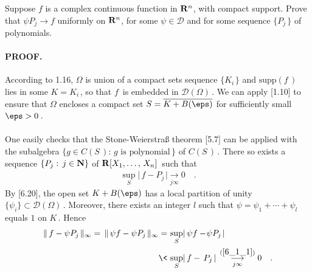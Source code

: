 {\CMUCS Suppose $f$ is a complex continuous function in ${\mathbf R}^n$, with compact support. \!\!Prove that $\psi P_j\to \!f$ uniformly on ${\mathbf R}^n$, for some $\psi\in \mathscr{D}$ and for some sequence $\{P_j\,\}$ of polynomials.}
\paragraph{PROOF.} According to 1.16, $\Omega$ is union of a compact sets sequence $\{K_{i\,}\}$ and $\text{supp} (f\,)$ lies in some $K= K_{i\,}$, so that $f\,$ is embedded in $\mathscr{D}(\Omega)\,$. We can apply [1.10] to ensure that $\Omega$ encloses a compact set $S=\overline{K +B(\eps)}$ for sufficiently small $\eps>0\,$.\\
\\
One easily checks that the Stone-Weierstraß theorem [5.7] can be applied with the subalgebra $ \{ g\in C(S\,) :\, g \text{ is polynomial}\,\}$ of $C(S\,)\,$.
There so exists a sequence $\{P_j:\, j\in {\mathbf N}\}$ of ${\mathbf R}[X_1,\dotsc,\, X_n]\,$ such that 
\begin{align}\label{6_1_1}
\sup_S \lvert\, f-P_{j\,} \rvert  \underset{j\infty}{\longrightarrow} 0\quad.
\end{align} 
 By [6.20], the open set $K +B(\eps)$ has a local partition of unity $\{\psi_i\}\subset \mathscr{D}(\Omega)\,$. Moreover, there exists an integer $l$ such that $\psi=\psi_1+\dotsb+\psi_l\,$ equals $1$ on $K\,$. Hence
\begin{align}\label{6_1_2}
\| \, f - \psi P_{j\,}\|_\infty=  \, \|  \,\psi f - \psi P_{j\,}\|_\infty 
=  &  \, \sup_S  \lvert \, \psi f -\! \psi P_{j\,}\rvert  \\
   \<  &  \,   \sup_S  \lvert  \, f -  \, P_{j\,} \rvert    \, \overset{(\ref{6_1_1})}{\underset{j\infty}{\longrightarrow}} 0\quad .
\end{align} 
\QED
